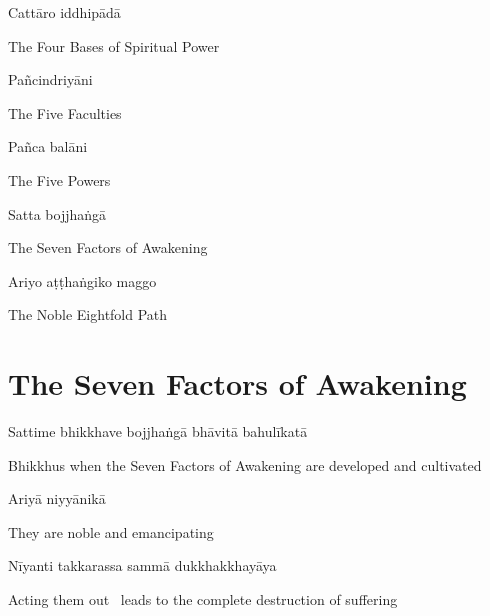Cattāro iddhipādā

\begin{english}
  The Four Bases of Spiritual Power
\end{english}

Pañcindriyāni

\begin{english}
  The Five Faculties
\end{english}

Pañca balāni

\begin{english}
  The Five Powers
\end{english}

Satta bojjhaṅgā

\begin{english}
  The Seven Factors of Awakening
\end{english}

Ariyo aṭṭhaṅgiko maggo

\begin{english}
  The Noble Eightfold Path
\end{english}

\suttaRef{[DN 16]}


\section{The Seven Factors of Awakening}
\label{seven-factors-of-awakening}

\begin{leader}
\end{leader}

Sattime bhikkhave bojjhaṅgā bhāvitā bahulīkatā

\begin{english}
  Bhikkhus when the Seven Factors of Awakening are developed and cultivated
\end{english}

Ariyā niyyānikā

\begin{english}
  They are noble and emancipating
\end{english}

Nīyanti takkarassa sammā dukkhakkhayāya

\begin{english}
  Acting them out \breathmark\ leads to the complete destruction of suffering
\end{english}

